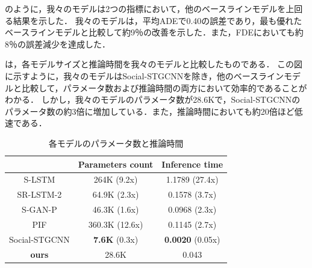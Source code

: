 \protect{}

のように，我々のモデルは2つの指標において，他のベースラインモデルを上回る結果を示した．
我々のモデルは，平均ADEで0.40の誤差であり，最も優れたベースラインモデルと比較して約9％の改善を示した．また，FDEにおいても約8％の誤差減少を達成した．

は，各モデルサイズと推論時間を我々のモデルと比較したものである．
この図に示すように，我々のモデルはSocial-STGCNN\cite{s-stgcnn}を除き，他のベースラインモデルと比較して，パラメータ数および推論時間の両方において効率的であることがわかる．
しかし，我々のモデルのパラメータ数が28.6Kで，Social-STGCNNのパラメータ数の約3倍に増加している．また，推論時間においても約20倍ほど低速である．

\begin{table}[hbtp]
  \centering
  \caption{各モデルのパラメータ数と推論時間\protect\footnotemark[6]}
  \label{tab:param-results}
  \footnotesize
  \begin{tabular}{c||c|c}
   & Parameters count & Inference time \\
  \hline\hline
  S-LSTM \cite{s-lstm} & 264K {\color{blue}(9.2x)} & 1.1789 {\color{blue}(27.4x)} \\
  \hline
  SR-LSTM-2 \cite{sr-lstm} & 64.9K {\color{blue}(2.3x)} & 0.1578 {\color{blue}(3.7x)} \\
  \hline
  S-GAN-P \cite{gupta2018social-s-gan-p} & 46.3K {\color{blue}(1.6x)} & 0.0968 {\color{blue}(2.3x)} \\
  \hline
  PIF \cite{liang2019peeking-pif} & 360.3K {\color{blue}(12.6x)} & 0.1145 {\color{blue}(2.7x)} \\
  \hline
  Social-STGCNN \cite{s-stgcnn} & \textbf{7.6K} {\color{blue}(0.3x)} & \textbf{0.0020} {\color{blue}(0.05x)} \\
  \hline \hline
  \textbf{ours} & 28.6K & 0.043 \\
  \hline 
  \end{tabular}
\end{table}

\protect{}

\newpage
